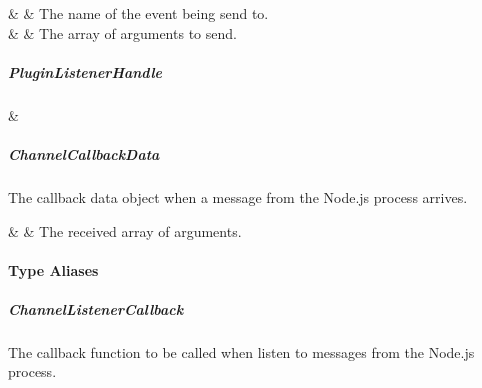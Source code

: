 \begin{interfacedesc}
   &  & The name of the event being send to. \\ \hline
        &   & The array of arguments to send. \\ \hline
\end{interfacedesc}   


\subparagraph{PluginListenerHandle}

\begin{interface}
   &  \\ \hline
\end{interface}


\subparagraph{ChannelCallbackData}

The callback data object when a message from the Node.js process arrives.

\begin{interfacedesc}
   &  & The received array of arguments. \\ \hline
\end{interfacedesc}


\newpage

\paragraph{Type Aliases}


\subparagraph{ChannelListenerCallback}

The callback function to be called when listen to messages from the Node.js process.

